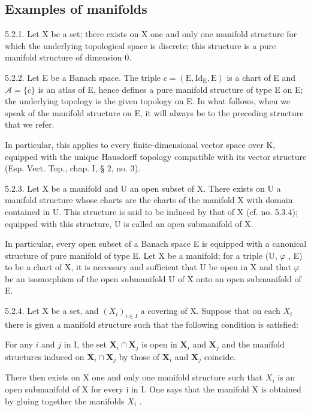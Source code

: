 \subsection{Examples of manifolds}

5.2.1. Let X be a set; there exists on X one and only one manifold structure for which the underlying topological space is discrete; this structure is a pure manifold structure of dimension 0.

5.2.2. Let E be a Banach space. The triple \(c = (\mathrm{E}, \mathrm{Id}_{\mathrm{E}}, \mathrm{E})\) is a chart of E and \(\mathcal{A} = \{c\}\) is an atlas of E, hence defines a pure manifold structure of type E on E; the underlying topology is the given topology on E. In what follows, when we speak of the manifold structure on E, it will always be to the preceding structure that we refer.

In particular, this applies to every finite-dimensional vector space over K, equipped with the unique Hausdorff topology compatible with its vector structure (Esp. Vect. Top., chap. I, § 2, no. 3).

5.2.3. Let X be a manifold and U an open subset of X. There exists on U a manifold structure whose charts are the charts of the manifold X with domain contained in U. This structure is said to be induced by that of X (cf. no. 5.3.4); equipped with this structure, U is called an open submanifold of X.

In particular, every open subset of a Banach space E is equipped with a canonical structure of pure manifold of type E. Let X be a manifold; for a triple (U, \(\varphi\) , E) to be a chart of X, it is necessary and sufficient that U be open in X and that \(\varphi\) be an isomorphism of the open submanifold U of X onto an open submanifold of E.

5.2.4. Let X be a set, and \((X_{i})_{i\in I}\) a covering of X. Suppose that on each \(X_{i}\) there is given a manifold structure such that the following condition is satisfied:

For any \(i\) and \(j\) in I, the set \(\mathbf{X}_{i} \cap \mathbf{X}_{j}\) is open in \(\mathbf{X}_{i}\) and \(\mathbf{X}_{j}\) and the manifold structures induced on \(\mathbf{X}_{i} \cap \mathbf{X}_{j}\) by those of \(\mathbf{X}_{i}\) and \(\mathbf{X}_{j}\) coincide.

There then exists on X one and only one manifold structure such that \(X_{i}\) is an open submanifold of X for every i in I. One says that the manifold X is obtained by gluing together the manifolds \(X_{i}\) .

